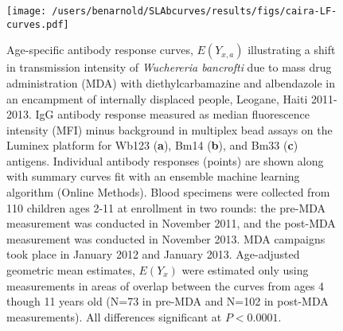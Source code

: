 \documentclass[11pt]{article}
\begin{document}
\clearpage
\begin{figure}[htbp]
\begin{center}
\texttt{[image: /users/benarnold/SLAbcurves/results/figs/caira-LF-curves.pdf]}
\begin{minipage}{\textwidth}
\caption{Age-specific antibody response curves, $E(Y_{x,a})$ illustrating a shift in transmission intensity of \textit{Wuchereria bancrofti} due to mass drug administration (MDA) with diethylcarbamazine and albendazole in an encampment of internally displaced people, Leogane, Haiti 2011-2013.  IgG antibody response measured as median fluorescence intensity (MFI) minus background in multiplex bead assays on the Luminex platform for Wb123 (\textbf{a}), Bm14 (\textbf{b}), and Bm33 (\textbf{c}) antigens. Individual antibody responses (points) are shown along with summary curves fit with an ensemble machine learning algorithm (Online Methods). Blood specimens were collected from 110 children ages 2-11 at enrollment in two rounds: the pre-MDA measurement was conducted in November 2011, and the post-MDA measurement was conducted in November 2013.  MDA campaigns took place in January 2012 and January 2013. Age-adjusted geometric mean estimates, $E(Y_x)$ were estimated only using measurements in areas of overlap between the curves from ages 4 though 11 years old (N=73 in pre-MDA and N=102 in post-MDA measurements). All differences significant at $P<0.0001$.}
\label{fig:cairaS5}
\end{minipage}
\end{center}
\end{figure}
\end{document}
